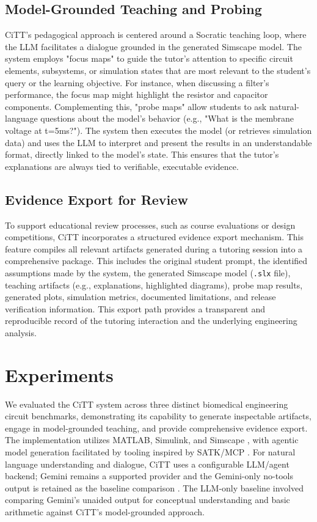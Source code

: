 \documentclass[10pt,twocolumn,letterpaper]{article}
\begin{document}
\subsection{Model-Grounded Teaching and Probing}
\label{sec:method_teaching}
CiTT's pedagogical approach is centered around a Socratic teaching loop, where the LLM facilitates a dialogue grounded in the generated Simscape model. The system employs "focus maps" to guide the tutor's attention to specific circuit elements, subsystems, or simulation states that are most relevant to the student's query or the learning objective. For instance, when discussing a filter's performance, the focus map might highlight the resistor and capacitor components. Complementing this, "probe maps" allow students to ask natural-language questions about the model's behavior (e.g., "What is the membrane voltage at t=5ms?"). The system then executes the model (or retrieves simulation data) and uses the LLM to interpret and present the results in an understandable format, directly linked to the model's state. This ensures that the tutor's explanations are always tied to verifiable, executable evidence.

\subsection{Evidence Export for Review}
\label{sec:method_export}
To support educational review processes, such as course evaluations or design competitions, CiTT incorporates a structured evidence export mechanism. This feature compiles all relevant artifacts generated during a tutoring session into a comprehensive package. This includes the original student prompt, the identified assumptions made by the system, the generated Simscape model (\texttt{.slx} file), teaching artifacts (e.g., explanations, highlighted diagrams), probe map results, generated plots, simulation metrics, documented limitations, and release verification information. This export path provides a transparent and reproducible record of the tutoring interaction and the underlying engineering analysis.

\section{Experiments}
\label{sec:experiments}
We evaluated the CiTT system across three distinct biomedical engineering circuit benchmarks, demonstrating its capability to generate inspectable artifacts, engage in model-grounded teaching, and provide comprehensive evidence export. The implementation utilizes MATLAB, Simulink, and Simscape \cite{mathworks_matlab, mathworks_simulink, mathworks_simscape}, with agentic model generation facilitated by tooling inspired by SATK/MCP \cite{mathworks_satk, matlab_agentic_toolkit}. For natural language understanding and dialogue, CiTT uses a configurable LLM/agent backend; Gemini remains a supported provider and the Gemini-only no-tools output is retained as the baseline comparison \cite{gemini_api_docs}. The LLM-only baseline involved comparing Gemini's unaided output for conceptual understanding and basic arithmetic against CiTT's model-grounded approach.
\end{document}
